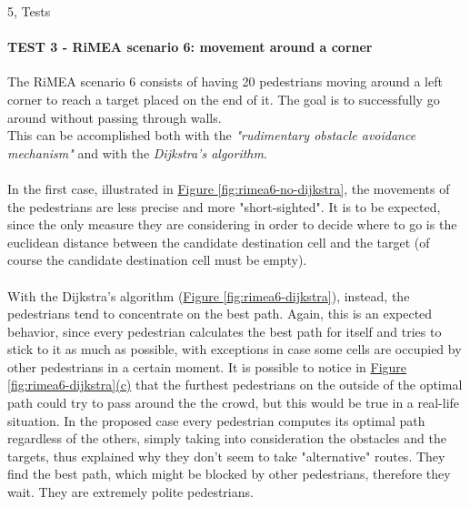 \documentclass[10pt,a4paper]{article}
\begin{document}
\begin{task}{5, Tests}
\paragraph{TEST 3 - RiMEA scenario 6: movement around a corner}
The RiMEA scenario 6 consists of having 20 pedestrians moving around a left corner to reach a target placed on the end of it.
The goal is to successfully go around without passing through walls.\\
This can be accomplished both with the \textit{"rudimentary obstacle avoidance mechanism"} and with the \textit{Dijkstra's algorithm}.\\\\
In the first case, illustrated in \hyperref[fig:rimea6-no-dijkstra]{Figure \ref{fig:rimea6-no-dijkstra}}, the movements of the pedestrians are less precise and more "short-sighted".
It is to be expected, since the only measure they are considering in order to decide where to go is the euclidean distance between the candidate destination cell and the target (of course the candidate destination cell must be empty).\\\\
With the Dijkstra's algorithm (\hyperref[fig:rimea6-dijkstra]{Figure \ref{fig:rimea6-dijkstra}}), instead, the pedestrians tend to concentrate on the best path.
Again, this is an expected behavior, since every pedestrian calculates the best path for itself and tries to stick to it as much as possible, with exceptions in case some cells are occupied by other pedestrians in a certain moment.
It is possible to notice in \hyperref[fig:rimea6-dijkstra]{Figure \ref{fig:rimea6-dijkstra}(c)} that the furthest pedestrians on the outside of the optimal path could try to pass around the the crowd, but this would be true in a real-life situation.
In the proposed case every pedestrian computes its optimal path regardless of the others, simply taking into consideration the obstacles and the targets, thus explained why they don't seem to take "alternative" routes. They find the best path, which might be blocked by other pedestrians, therefore they wait. They are extremely polite pedestrians.


\end{task}
\end{document}
